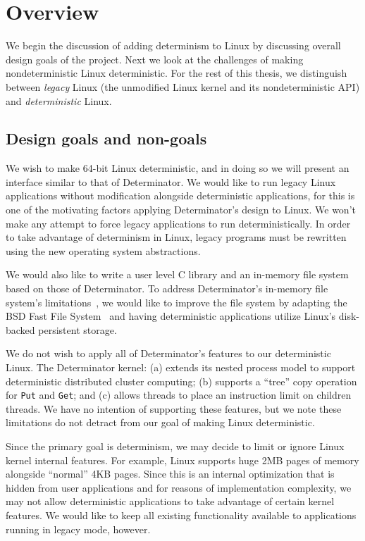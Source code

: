 \section{Overview}

We begin the discussion of adding determinism to Linux by discussing overall
design goals of the project. Next we look at the challenges of making
nondeterministic Linux deterministic. For the rest of this thesis, we
distinguish between \emph{legacy} Linux (the unmodified Linux kernel and its
nondeterministic API) and \emph{deterministic} Linux.

\subsection{Design goals and non-goals}

We wish to make 64-bit Linux deterministic, and in doing so we will present an
interface similar to that of Determinator. We would like to run legacy
Linux applications without modification alongside deterministic applications,
for this is one of the motivating factors applying Determinator's design to
Linux. We won't make any attempt to force legacy applications to run
deterministically. In order to take advantage of determinism in
Linux, legacy programs must be rewritten using the new operating system
abstractions.

We would also like to write a user level C library and an in-memory file system
based on those of Determinator.
To address Determinator's in-memory file system's limitations~\cite{Aviram10,
Aviram10cloud}, we would like to improve the file system by adapting
the BSD Fast File System~\cite{mckusick1984fast} and having deterministic
applications utilize Linux's disk-backed persistent storage.

We do not wish to apply all of Determinator's features to our deterministic
Linux. The Determinator kernel: (a) extends its nested process model to support
deterministic distributed cluster computing; (b) supports a ``tree'' copy
operation for {\tt Put} and {\tt Get}; and (c) allows
threads to place an instruction limit on
children threads. We have no intention of supporting these features, but we note
these limitations do not detract from our goal of making Linux deterministic.

Since the primary goal is determinism, we may decide to limit or ignore Linux
kernel internal features. For example, Linux supports huge 2MB pages of memory
alongside ``normal'' 4KB pages. Since this is an internal optimization that is
hidden from user applications and for reasons of
implementation complexity, we may not allow deterministic applications to take
advantage of certain kernel features. We would like to keep all existing
functionality available to applications running in legacy mode, however.

